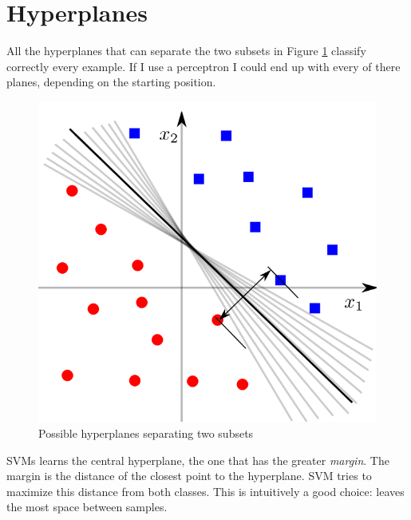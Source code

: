 \section{Hyperplanes}
    All the hyperplanes that can separate the two subsets in Figure \ref{fig:hyperplanesSVMs} classify correctly every example. If I use a perceptron I could end up with every of there planes, depending on the starting position. 
    \begin{figure}[ht]
        \centering
        \includegraphics[scale=0.3]{images/hyperplanes_SVMs.png}
        \caption{Possible hyperplanes separating two subsets}
        \label{fig:hyperplanesSVMs}
    \end{figure}
    SVMs learns the central hyperplane, the one that has the greater \textit{margin}. The margin is the distance  of the closest point to the hyperplane. SVM tries to maximize this distance from both classes.
    This is intuitively a good choice: leaves the most space between samples.
    

